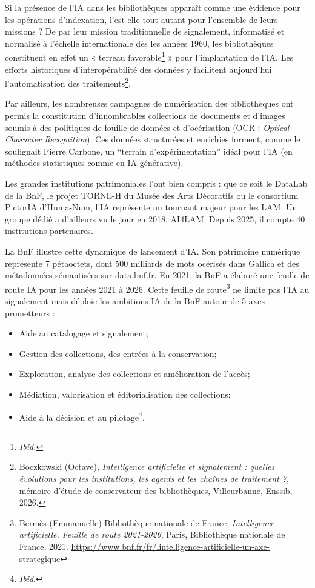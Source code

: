 Si la présence de l'IA dans les bibliothèques apparaît comme une évidence pour les opérations d'indexation, l'est-elle tout autant pour l'ensemble de leurs missions ?
De par leur mission traditionnelle de signalement, informatisé et normalisé à l'échelle internationale dès les années 1960, les bibliothèques constituent en effet un « terreau favorable\footnote{\textit{Ibid.}} » pour l'implantation de l'IA. Les efforts historiques d'interopérabilité des données y facilitent aujourd'hui l'automatisation des traitements\footnote{Boczkowski (Octave), \textit{Intelligence artificielle et signalement : quelles évolutions pour les institutions, les agents et les chaînes de traitement ?}, mémoire d'étude de conservateur des bibliothèques, Villeurbanne, Enssib, 2026.}.

Par ailleurs, les nombreuses campagnes de numérisation des bibliothèques ont permis la constitution d'innombrables collections de documents et d'images soumis à des politiques de fouille de données et d’océrisation (OCR : \textit{Optical Character Recognition}). Ces données structurées et enrichies forment, comme le soulignait Pierre Carbone, un \enquote{terrain d’expérimentation} idéal pour l’IA (en méthodes statistiques comme en IA générative).

Les grandes institutions patrimoniales l’ont bien compris : que ce soit le DataLab de la BnF, le projet TORNE-H du Musée des Arts Décoratifs ou le consortium PictorIA d’Huma-Num, l’IA représente un tournant majeur pour les LAM. Un groupe dédié a d’ailleurs vu le jour en 2018, AI4LAM. Depuis 2025, il compte 40 institutions partenaires.


La BnF illustre cette dynamique de lancement d’IA. Son patrimoine numérique représente 7 pétaoctets, dont 500 milliards de mots océrisés dans Gallica et des métadonnées sémantisées sur data.bnf.fr. En 2021, la BnF a élaboré une feuille de route IA pour les années 2021 à 2026. 
Cette feuille de route\footnote{Bermès (Emmanuelle) Bibliothèque nationale de France, \textit{Intelligence artificielle. Feuille de route 2021-2026}, Paris, Bibliothèque nationale de France, 2021. \url{https://www.bnf.fr/fr/lintelligence-artificielle-un-axe-strategique}} ne limite pas l’IA au signalement mais déploie les ambitions IA de la BnF autour de 5 axes prometteurs : 

\begin{itemize}
	\item Aide au catalogage et signalement;
	\item Gestion des collections, des entrées à la conservation;
	\item Exploration, analyse des collections et amélioration de l’accès;
	\item Médiation, valorisation et éditorialisation des collections;
	\item Aide à la décision et au pilotage\footnote{\textit{Ibid}.}.
\end{itemize}

